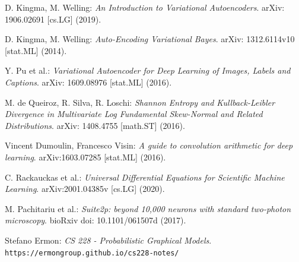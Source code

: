 \documentclass[12pt]{report}
\theoremstyle{definition}
\begin{document}
\begin{thebibliography}{9}

D. Kingma, M. Welling:
\textit{An Introduction to Variational Autoencoders}.
arXiv: 1906.02691 [cs.LG] (2019).

D. Kingma, M. Welling:
\textit{Auto-Encoding Variational Bayes}.
arXiv: 1312.6114v10 [stat.ML] (2014).

Y. Pu et al.:
\textit{Variational Autoencoder for Deep Learning of Images, Labels and Captions}.
arXiv: 1609.08976 [stat.ML] (2016).

M. de Queiroz, R. Silva, R. Loschi:
\textit{Shannon Entropy and Kullback-Leibler Divergence in Multivariate Log Fundamental Skew-Normal and Related Distributions}.
arXiv: 1408.4755 [math.ST] (2016).

Vincent Dumoulin, Francesco Visin:
\textit{A guide to convolution arithmetic for deep learning}.
arXiv:1603.07285 [stat.ML] (2016).

C. Rackauckas et al.:
\textit{Universal Differential Equations for Scientific Machine Learning}.
arXiv:2001.04385v [cs.LG] (2020).

M. Pachitariu et al.:
\textit{Suite2p: beyond 10,000 neurons with standard two-photon microscopy}.
bioRxiv doi: 10.1101/061507d (2017).

Stefano Ermon: \textit{CS 228 - Probabilistic Graphical Models}.
\\\texttt{https://ermongroup.github.io/cs228-notes/}
\end{thebibliography}
\end{document}
